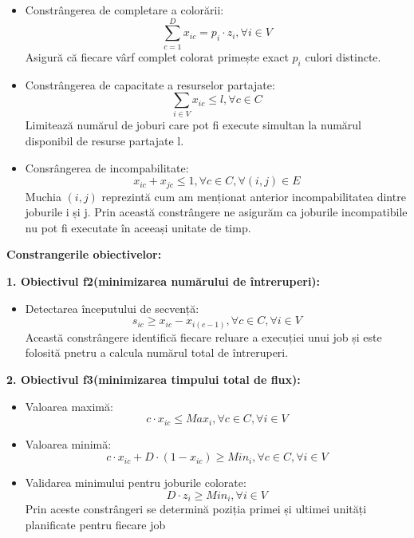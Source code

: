     \begin{itemize}
    \item Constrângerea de completare a colorării:
    \begin{equation}
      \sum_{c=1}^{D} x_{ic}= p_i \cdot z_i, \forall i \in V
    \end{equation}
    Asigură că fiecare vârf complet colorat primește exact $p_i$ culori distincte.

    \item Constrângerea de capacitate a resurselor partajate:
    \begin{equation}
    \sum_{i \in V} x_{ic} \leq l, \forall c \in C
    \end{equation}
    Limitează numărul de joburi care pot fi execute simultan la numărul disponibil de resurse partajate l.

    \item Consrângerea de incompabilitate:
    \begin{equation}
     x_{ic} + x_{jc} \leq 1, \forall c \in C, \forall (i,j) \in E
    \end{equation}
    Muchia $(i,j)$ reprezintă cum am menționat anterior incompabilitatea dintre joburile i și j. Prin această constrângere ne asigurăm ca joburile incompatibile nu pot fi executate în aceeași unitate de timp.      
    \end{itemize}
    {\bf Constrangerile obiectivelor:}

    {\bf 1. Obiectivul f2(minimizarea numărului de întreruperi):}
    \begin{itemize}
      \item Detectarea începutului de secvență:
      \begin{equation}
        s_{ic} \geq x_{ic} - x_{i(c-1)}, \forall c \in C, \forall i \in V
      \end{equation}
      Această constrângere identifică fiecare reluare a execuției unui job și este folosită pnetru a calcula numărul total de întreruperi.
    \end{itemize}
    {\bf 2. Obiectivul f3(minimizarea timpului total de flux):}
    \begin{itemize}
      \item Valoarea maximă:
      \begin{equation}
        c \cdot x_{ic} \leq Max_i, \forall c \in C, \forall i \in V
      \end{equation}
      \item Valoarea minimă:
      \begin{equation}
        c \cdot x_{ic} + D \cdot (1-x_{ic}) \geq Min_i, \forall c \in C, \forall i \in V
      \end{equation}
      \item Validarea minimului pentru joburile colorate:
      \begin{equation}
        D \cdot z_i \geq Min_i, \forall i \in V
      \end{equation}
      Prin aceste constrângeri se determină poziția primei și ultimei unități planificate pentru fiecare job
    \end{itemize}
    
